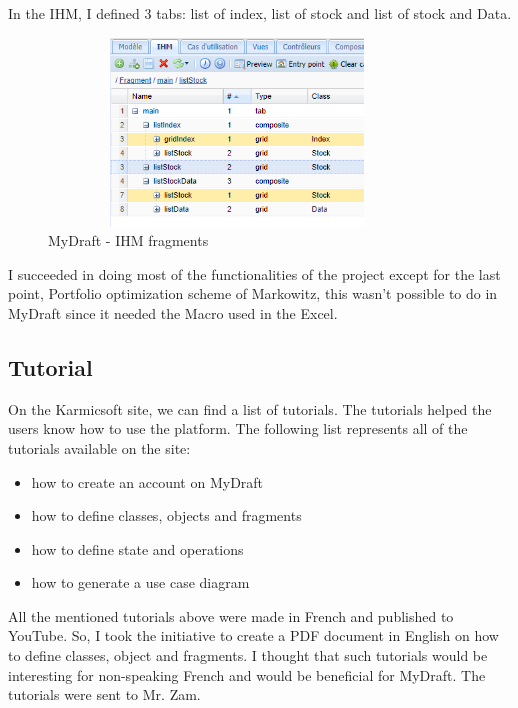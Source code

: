 \documentclass{report}
\begin{document}
In the IHM, I defined 3 tabs: list of index, list of stock and list of stock and Data.
\begin{figure}[H]
\centering
\includegraphics[width=10cm,height=5cm,keepaspectratio]{ihm.png}
\caption{MyDraft - IHM fragments}
\end{figure}

I succeeded in doing most of the functionalities of the project except for the last point, Portfolio optimization scheme of Markowitz, this wasn't possible to do in MyDraft since it needed the Macro used in the Excel.\\

\subsection{Tutorial}
On the Karmicsoft site, we can find a list of tutorials. The tutorials helped the users know how to use the platform. The following list represents all of the tutorials available on the site: 
\begin{itemize}
\item how to create an account on MyDraft 
\item how to define classes, objects and fragments
\item how to define state and operations
\item how to generate a use case diagram
\end{itemize}

All the mentioned tutorials above were made in French and published to YouTube. So, I took the initiative to create a PDF document in English on how to define classes, object and fragments. I thought that such tutorials would be interesting for non-speaking French and would be beneficial for MyDraft. The tutorials were sent to Mr. Zam.
\end{document}
